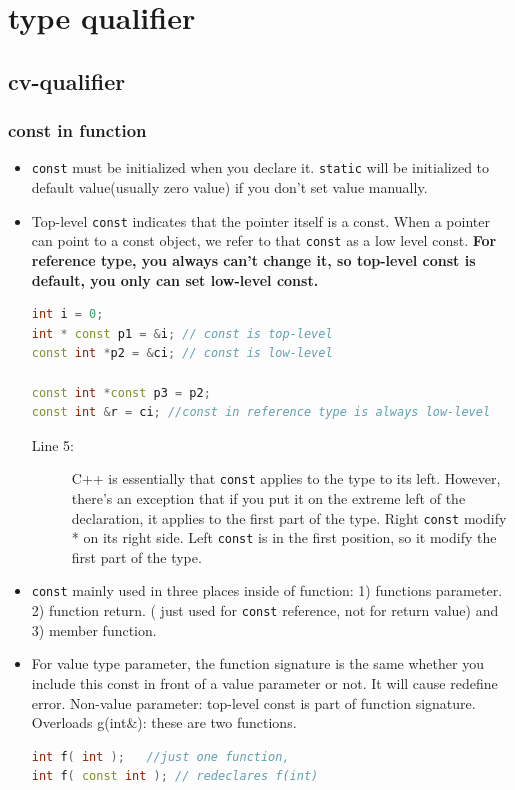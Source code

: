 \documentclass[a4paper,11pt,twoside]{book}
\begin{document}
\section{type qualifier}
\subsection{cv-qualifier}
\subsubsection{const in function}
\begin{itemize}
	
	\item \texttt{const} must be initialized when you declare it. \texttt{static} will be initialized to default value(usually zero value) if you don't set value manually. 
	
	\item Top-level \texttt{const} indicates that the pointer itself is a const. When a pointer can point to a const object, we refer to that \texttt{const} as a low level const.  \textbf{For reference type, you always can't change it, so top-level const is default, you only can set low-level const.}
\begin{lstlisting}[frame=single, language=c++]
int i = 0;
int * const p1 = &i; // const is top-level
const int *p2 = &ci; // const is low-level

const int *const p3 = p2;
const int &r = ci; //const in reference type is always low-level
\end{lstlisting}
	\begin{description}
		\item[Line 5:] C++ is essentially that \texttt{const} applies to the type to its left. However, there's an exception that if you put it on the extreme left of the declaration, it applies to the first part of the type. Right \texttt{const} modify * on its right side. Left \texttt{const} is in the first position, so it modify the first part of the type. 
	\end{description}
	
	\item \texttt{const} mainly used in three places inside of function: 1) functions parameter. 2) function return. ( just used for \texttt{const} reference, not for return value) and 3) member function.

	
	\item For value type parameter, the function signature is the same whether you include this const in front of a value parameter or not. It will cause redefine error. Non-value parameter: top-level const is part of function signature. Overloads g(int\&): these are two functions.
\begin{lstlisting}[frame=single, language=c++]
int f( int );   //just one function, 
int f( const int ); // redeclares f(int)


\end{lstlisting}
\end{itemize}
\end{document}
